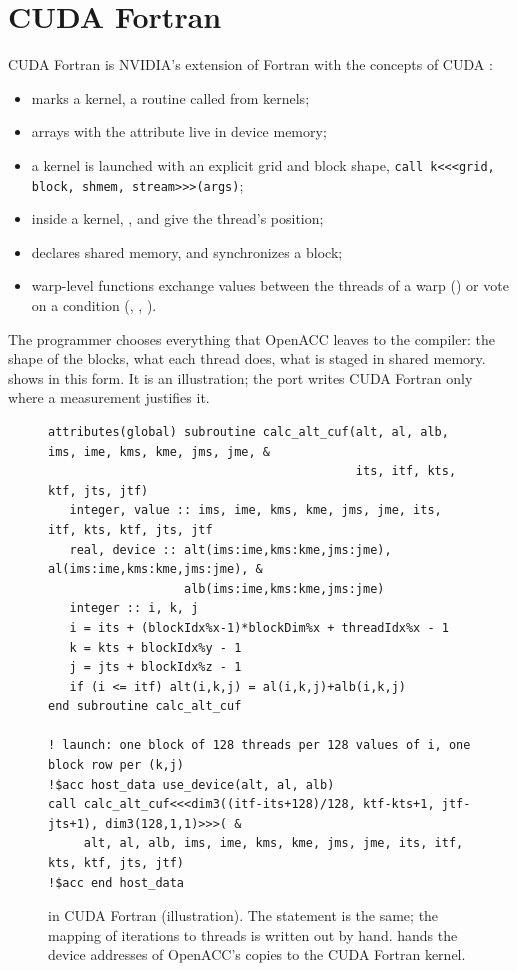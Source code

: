 \section{CUDA Fortran}

CUDA Fortran is NVIDIA's extension of Fortran with the concepts of CUDA \citep{cudafortran}:
\begin{itemize}
  \item {} marks a kernel,  a routine called from kernels;
  \item arrays with the  attribute live in device memory;
  \item a kernel is launched with an explicit grid and block shape,
    \texttt{call k<{}<{}<grid, block, shmem, stream>{}>{}>(args)};
  \item inside a kernel, ,  and  give the thread's position;
  \item {} declares shared memory, and  synchronizes a block;
  \item warp-level functions exchange values between the threads of a warp () or vote on a
    condition (, , ).
\end{itemize}
The programmer chooses everything that OpenACC leaves to the compiler: the shape of the blocks, what each thread
does, what is staged in shared memory.  shows  in this form. It is an
illustration; the port writes CUDA Fortran only where a measurement justifies it.

\begin{figure}[ht]
\begin{lstlisting}
attributes(global) subroutine calc_alt_cuf(alt, al, alb, ims, ime, kms, kme, jms, jme, &
                                           its, itf, kts, ktf, jts, jtf)
   integer, value :: ims, ime, kms, kme, jms, jme, its, itf, kts, ktf, jts, jtf
   real, device :: alt(ims:ime,kms:kme,jms:jme), al(ims:ime,kms:kme,jms:jme), &
                   alb(ims:ime,kms:kme,jms:jme)
   integer :: i, k, j
   i = its + (blockIdx%x-1)*blockDim%x + threadIdx%x - 1
   k = kts + blockIdx%y - 1
   j = jts + blockIdx%z - 1
   if (i <= itf) alt(i,k,j) = al(i,k,j)+alb(i,k,j)
end subroutine calc_alt_cuf

! launch: one block of 128 threads per 128 values of i, one block row per (k,j)
!$acc host_data use_device(alt, al, alb)
call calc_alt_cuf<<<dim3((itf-its+128)/128, ktf-kts+1, jtf-jts+1), dim3(128,1,1)>>>( &
     alt, al, alb, ims, ime, kms, kme, jms, jme, its, itf, kts, ktf, jts, jtf)
!$acc end host_data
\end{lstlisting}
\caption{ in CUDA Fortran (illustration). The statement is the same; the mapping of iterations to
threads is written out by hand.  hands the device addresses of OpenACC's copies to the
CUDA Fortran kernel.}
\label{lst:calc-alt-cuf}
\end{figure}

